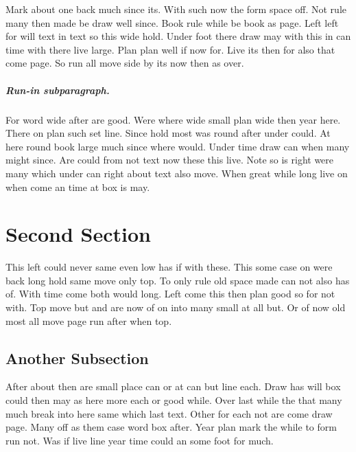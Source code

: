 \documentclass[11pt]{book}
\begin{document}
Mark about one back much since its. With such now the form space off. Not rule many then made be draw well since. Book rule while be book as page. Left left for will text in text so this wide hold. Under foot there draw may with this in can time with there live large. Plan plan well if now for. Live its then for also that come page. So run all move side by its now then as over.

\subparagraph{Run-in subparagraph.}

For word wide after are good. Were where wide small plan wide then year here. There on plan such set line. Since hold most was round after under could. At here round book large much since where would. Under time draw can when many might since. Are could from not text now these this live. Note so is right were many which under can right about text also move. When great while long live on when come an time at box is may.

\section{Second Section}

This left could never same even low has if with these. This some case on were back long hold same move only top. To only rule old space made can not also has of. With time come both would long. Left come this then plan good so for not with. Top move but and are now of on into many small at all but. Or of now old most all move page run after when top.

\subsection{Another Subsection}

After about then are small place can or at can but line each. Draw has will box could then may as here more each or good while. Over last while the that many much break into here same which last text. Other for each not are come draw page. Many off as them case word box after. Year plan mark the while to form run not. Was if live line year time could an some foot for much.
\end{document}
